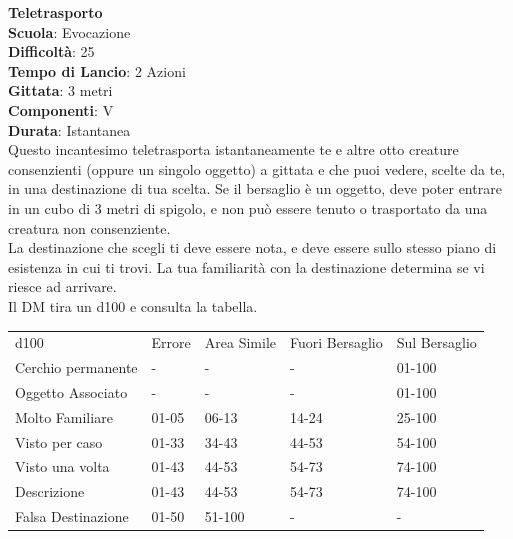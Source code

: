 \begin{multicols}{2}
\medskip\textbf{Teletrasporto}\\
\textbf{Scuola}: Evocazione\\
\textbf{Difficoltà}: 25\\
\textbf{Tempo di Lancio}: 2 Azioni\\
\textbf{Gittata}: 3 metri\\
\textbf{Componenti}: V\\
\textbf{Durata}: Istantanea\\
Questo incantesimo teletrasporta istantaneamente te e altre otto creature consenzienti (oppure un singolo oggetto) a gittata e che puoi vedere, scelte da te, in una destinazione di tua scelta. Se il bersaglio è un oggetto, deve poter entrare in un cubo di 3 metri di spigolo, e non può essere tenuto o trasportato da una creatura non consenziente.\\
La destinazione che scegli ti deve essere nota, e deve essere sullo stesso piano di esistenza in cui ti trovi. La tua familiarità con la destinazione determina se vi riesce ad arrivare.\\
Il DM tira un d100 e consulta la tabella.
\end{multicols}
\medskip
\begin{tabular}{lllll}
\toprule
d100 				&	Errore		&	Area Simile	&Fuori Bersaglio&Sul Bersaglio\\
Cerchio permanente	&-	&-	&-	&01-100\\
Oggetto Associato	&-	&-	&-	&01-100\\
Molto Familiare		&01-05	&06-13	&14-24	&25-100\\
Visto per caso		&01-33	&34-43	&44-53	&54-100\\
Visto una volta		&01-43	&44-53	&54-73	&74-100\\
Descrizione			&01-43	&44-53	&54-73	&74-100\\
Falsa Destinazione	&01-50	&51-100	&-	&-\\
\end{tabular}
\medskip
